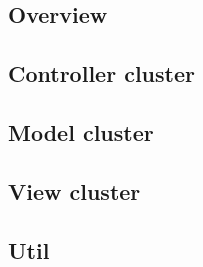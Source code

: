 \subsection{Overview}

\subsection{Controller cluster}

\subsection{Model cluster}

\subsection{View cluster}

\subsection{Util}

